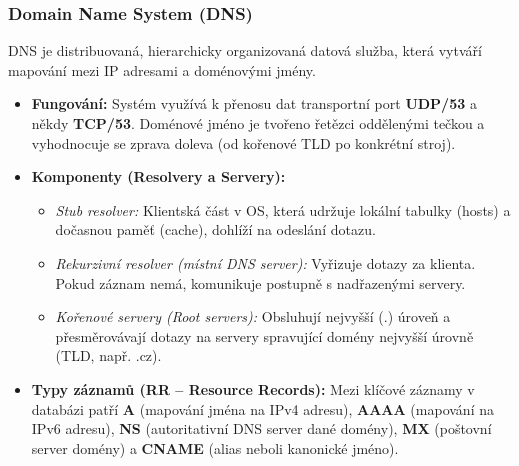     \subsubsection{Domain Name System (DNS)}
        DNS je distribuovaná, hierarchicky organizovaná datová služba, která vytváří mapování mezi IP adresami a doménovými jmény.
        \begin{itemize}
            \item \textbf{Fungování:} Systém využívá k přenosu dat transportní port \textbf{UDP/53} a někdy \textbf{TCP/53}. Doménové jméno je tvořeno řetězci oddělenými tečkou a vyhodnocuje se zprava doleva (od kořenové TLD po konkrétní stroj).
            \item \textbf{Komponenty (Resolvery a Servery):}
            \begin{itemize}
                \item \textit{Stub resolver:} Klientská část v OS, která udržuje lokální tabulky (hosts) a dočasnou paměť (cache), dohlíží na odeslání dotazu.
                \item \textit{Rekurzivní resolver (místní DNS server):} Vyřizuje dotazy za klienta. Pokud záznam nemá, komunikuje postupně s nadřazenými servery.
                \item \textit{Kořenové servery (Root servers):} Obsluhují nejvyšší (.) úroveň a přesměrovávají dotazy na servery spravující domény nejvyšší úrovně (TLD, např. .cz).
            \end{itemize}
            \item \textbf{Typy záznamů (RR -- Resource Records):} Mezi klíčové záznamy v databázi patří \textbf{A} (mapování jména na IPv4 adresu), \textbf{AAAA} (mapování na IPv6 adresu), \textbf{NS} (autoritativní DNS server dané domény), \textbf{MX} (poštovní server domény) a \textbf{CNAME} (alias neboli kanonické jméno).
        \end{itemize}
